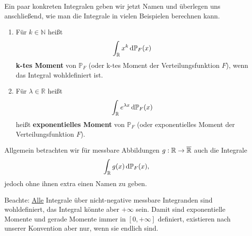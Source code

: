 Ein paar konkreten Integralen geben wir jetzt Namen und \"uberlegen uns anschlie\ss end, wie man die Integrale in vielen Beispielen berechnen kann.
\begin{deff} 


	\begin{enumerate}[label=(\roman*)]
		\item F\"ur $k\in \mathbb{N}$ hei\ss t \[ \int_{\mathbb{R}} x^k \, \mathrm{d} \mathbb{P}_F(x) \]  \textbf{k-tes Moment} von $ \mathbb{P}_F $ (oder k-tes Moment der Verteilungsfunktion $F$), wenn das Integral wohldefiniert ist.
		\item F\"ur $\lambda \in \mathbb{R}$ hei\ss t\[ \int_{\mathbb{R}} e^{\lambda x} \, \mathrm{d} \mathbb{P}_F(x) \] heißt \textbf{exponentielles Moment} von $ \mathbb{P}_F $ (oder exponentielles Moment der Verteilungsfunktion $F$).
	\end{enumerate}
	 Allgemein betrachten wir f\"ur messbare Abbildungen $g:\mathbb{R}\to \overline {\mathbb{R}}$ auch die Integrale 
		\[ \int_{\mathbb{R}} g(x) \, \mathrm{d} \mathbb{P}_F(x), \] 
		jedoch ohne ihnen extra einen Namen zu geben.\smallskip

	Beachte: \underline{Alle} Integrale \"uber nicht-negative messbare Integranden sind wohldefiniert, das Integral k\"onnte aber $+\infty$ sein. Damit sind exponentielle Momente und gerade Momente immer in $[0,+\infty]$ definiert, existieren nach unserer Konvention aber nur, wenn sie endlich sind.
\end{deff}



